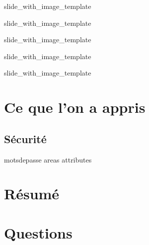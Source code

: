 \documentclass{beamer}
\begin{document}
\def\titlename{Team}
\def\imagepath{images/database/Team.png}
 {slide_with_image_template}

\def\titlename{Task}
\def\imagepath{images/database/Task.png}
 {slide_with_image_template}

\def\titlename{Event}
\def\imagepath{images/database/Event.png}
 {slide_with_image_template}

\def\titlename{Document}
\def\imagepath{images/database/Document.png}
 {slide_with_image_template}

\def\titlename{Message}
\def\imagepath{images/database/Message.png}
 {slide_with_image_template}

\section{Ce que l'on a appris}
\subsection{Sécurité}
 {motsdepasse}
 {areas}
 {attributes}

\section{Résumé}


\section{Questions}

\end{document}
